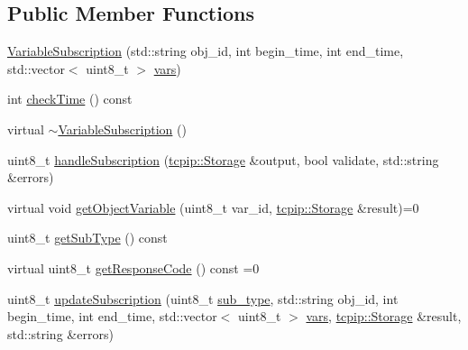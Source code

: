 \subsection*{Public Member Functions}
\begin{DoxyCompactItemize}
\item 
\hyperlink{classtraci__api_1_1_variable_subscription_a9d9f52126f0b883aa0d83cc3dbd32f14}{Variable\+Subscription} (std\+::string obj\+\_\+id, int begin\+\_\+time, int end\+\_\+time, std\+::vector$<$ uint8\+\_\+t $>$ \hyperlink{classtraci__api_1_1_variable_subscription_a59bec6554debe2d14d75c29017561959}{vars})
\item 
int \hyperlink{classtraci__api_1_1_variable_subscription_a6e17a9560c53c7c9543599f93caeeaf8}{check\+Time} () const
\item 
virtual \hyperlink{classtraci__api_1_1_variable_subscription_afc66a609515b051a28df4df35cbcbe61}{$\sim$\+Variable\+Subscription} ()
\item 
uint8\+\_\+t \hyperlink{classtraci__api_1_1_variable_subscription_ab75320e8ec7d1406ea47a703fb09de63}{handle\+Subscription} (\hyperlink{classtcpip_1_1_storage}{tcpip\+::\+Storage} \&output, bool validate, std\+::string \&errors)
\item 
virtual void \hyperlink{classtraci__api_1_1_variable_subscription_a884dba03a44455e86c417c3641ec6aa4}{get\+Object\+Variable} (uint8\+\_\+t var\+\_\+id, \hyperlink{classtcpip_1_1_storage}{tcpip\+::\+Storage} \&result)=0
\item 
uint8\+\_\+t \hyperlink{classtraci__api_1_1_variable_subscription_a598f7414334878f7943bfadbbf6a42d4}{get\+Sub\+Type} () const
\item 
virtual uint8\+\_\+t \hyperlink{classtraci__api_1_1_variable_subscription_a3e852072c435d02f96ff91f81506cef9}{get\+Response\+Code} () const =0
\item 
uint8\+\_\+t \hyperlink{classtraci__api_1_1_variable_subscription_a4a56033c7b432c2e2d029ca5fd5c3468}{update\+Subscription} (uint8\+\_\+t \hyperlink{classtraci__api_1_1_variable_subscription_a93110dcf3a32ff7a6a73ad3f8ff371d6}{sub\+\_\+type}, std\+::string obj\+\_\+id, int begin\+\_\+time, int end\+\_\+time, std\+::vector$<$ uint8\+\_\+t $>$ \hyperlink{classtraci__api_1_1_variable_subscription_a59bec6554debe2d14d75c29017561959}{vars}, \hyperlink{classtcpip_1_1_storage}{tcpip\+::\+Storage} \&result, std\+::string \&errors)
\end{DoxyCompactItemize}
